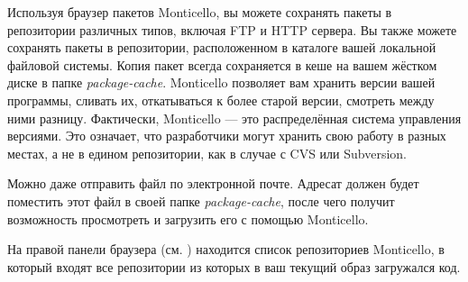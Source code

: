 \documentclass[a4paper,10pt,twoside]{book}
\begin{document}
{%
Используя браузер пакетов Monticello, вы можете сохранять пакеты в репозитории различных типов, включая FTP и HTTP сервера. Вы также можете сохранять пакеты в репозитории, расположенном в каталоге вашей локальной файловой системы.
Копия пакет всегда сохраняется в кеше на вашем жёстком диске в папке \emph{package-cache}.
Monticello позволяет вам хранить версии вашей программы, сливать их, откатываться к более старой версии, смотреть между ними разницу. 
Фактически, Monticello --- это распределённая система управления версиями. Это означает, что разработчики могут хранить свою работу в разных местах, а не в едином репозитории, как в случае с CVS или Subversion.

Можно даже отправить файл  по электронной почте.
Адресат должен будет поместить этот файл в своей папке \emph{package-cache}, после чего получит возможность просмотреть и загрузить его с помощью Monticello.

На правой панели браузера (см. ) находится список репозиториев Monticello, в который входят все репозитории из которых в ваш текущий образ загружался код.

}
\end{document}
